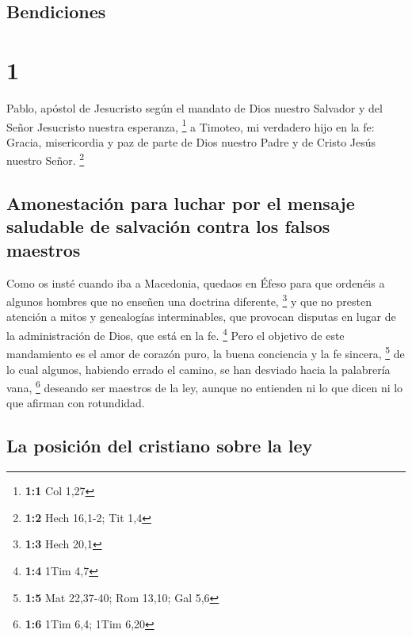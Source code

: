 \hypertarget{bendiciones}{%
\subsection{Bendiciones}\label{bendiciones}}

\hypertarget{section}{%
\section{1}\label{section}}

 Pablo, apóstol de Jesucristo según el mandato de Dios
nuestro Salvador y del Señor Jesucristo nuestra esperanza, \footnote{\textbf{1:1}
  Col 1,27}  a Timoteo, mi verdadero hijo en la fe:
Gracia, misericordia y paz de parte de Dios nuestro Padre y de Cristo
Jesús nuestro Señor. \footnote{\textbf{1:2} Hech 16,1-2; Tit 1,4}

\hypertarget{amonestaciuxf3n-para-luchar-por-el-mensaje-saludable-de-salvaciuxf3n-contra-los-falsos-maestros}{%
\subsection{Amonestación para luchar por el mensaje saludable de
salvación contra los falsos
maestros}\label{amonestaciuxf3n-para-luchar-por-el-mensaje-saludable-de-salvaciuxf3n-contra-los-falsos-maestros}}

 Como os insté cuando iba a Macedonia, quedaos en Éfeso
para que ordenéis a algunos hombres que no enseñen una doctrina
diferente, \footnote{\textbf{1:3} Hech 20,1}  y que no
presten atención a mitos y genealogías interminables, que provocan
disputas en lugar de la administración de Dios, que está en la fe.
\footnote{\textbf{1:4} 1Tim 4,7}  Pero el objetivo de este
mandamiento es el amor de corazón puro, la buena conciencia y la fe
sincera, \footnote{\textbf{1:5} Mat 22,37-40; Rom 13,10; Gal 5,6}
 de lo cual algunos, habiendo errado el camino, se han
desviado hacia la palabrería vana, \footnote{\textbf{1:6} 1Tim 6,4; 1Tim
  6,20}  deseando ser maestros de la ley, aunque no
entienden ni lo que dicen ni lo que afirman con rotundidad.

\hypertarget{la-posiciuxf3n-del-cristiano-sobre-la-ley}{%
\subsection{La posición del cristiano sobre la
ley}\label{la-posiciuxf3n-del-cristiano-sobre-la-ley}}

